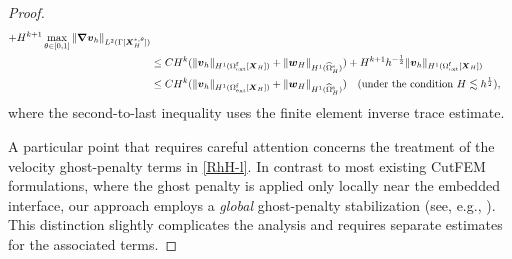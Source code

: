 \documentclass[11pt,reqno]{amsart}
\theoremstyle{definition}
\theoremstyle{plain}
\numberwithin{theorem}{section}
\numberwithin{proposition}{section}
\numberwithin{lemma}{section}
\numberwithin{equation}{section}
\newcommand{\bs}[1]{\boldsymbol{#1}}
\newcommand{\uu}[1]  {{\bs{#1}} }
\newcommand{\grad}   { \uu{\nabla}    }
\renewcommand{\(}{\bigl(}
\renewcommand{\)}{\bigr)}
\begin{document}
\begin{proof}
\begin{align*}
+ H^{k+1} \max_{\theta\in[0,1]} \|\grad {\bs v}_h\|_{L^2(\Gamma[{\bs X}_H^{*,\theta}])} \notag\\
&\le CH^k (\|{\bs v}_h\|_{H^1(\Omega^{\rm f}_{\rm ext}[\bs X_H])}+ \|{\bs w}_H\|_{H^1(\widehat{\Omega}^{\rm s}_H)} ) 
+H^{k+1}h^{-\frac12} \|{\bs v}_h\|_{H^1(\Omega^{\rm f}_{\rm ext}[\bs X_H])} \notag\\
&\le CH^k (\|{\bs v}_h\|_{H^1(\Omega^{\rm f}_{\rm ext}[\bs X_H])}+ \|{\bs w}_H\|_{H^1(\widehat{\Omega}^{\rm s}_H)} ) 
\quad\mbox{(under the condition $H\lesssim h^{\frac12}$)} ,
\end{align*} 
where the second-to-last inequality uses the finite element inverse trace estimate. 

A particular point that requires careful attention concerns the treatment of the velocity ghost-penalty terms in \eqref{RhH-l}. In contrast to most existing CutFEM formulations, where the ghost penalty is applied only locally near the embedded interface, our approach employs a \emph{global} ghost-penalty stabilization (see, e.g., \cite{maxim-and-whal-25}). This distinction slightly complicates the analysis and requires separate estimates for the associated terms.


\end{proof}
\end{document}
